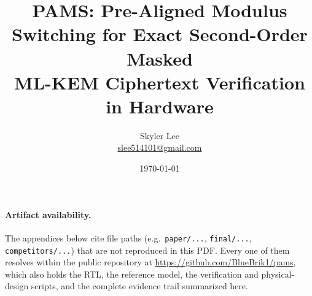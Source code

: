 \documentclass[10pt,twocolumn]{article}
\title{\Large\bfseries PAMS: Pre-Aligned Modulus Switching for Exact Second-Order Masked\\ ML-KEM Ciphertext Verification in Hardware}
\author{Skyler Lee\\ \small \href{mailto:slee514101@gmail.com}{slee514101@gmail.com}}
\date{\today}
\theoremstyle{definition}
\theoremstyle{remark}
\newcommand{\file}[1]{\texttt{#1}}
\begin{document}










\FloatBarrier



\clearpage
\onecolumn
\appendix
\paragraph{Artifact availability.} The appendices below cite file paths (e.g.\ \file{paper/...}, \file{final/...}, \file{competitors/...}) that are not reproduced in this PDF. Every one of them resolves within the public repository at \url{https://github.com/BlueBrik1/pams}, which also holds the RTL, the reference model, the verification and physical-design scripts, and the complete evidence trail summarized here.




\end{document}
